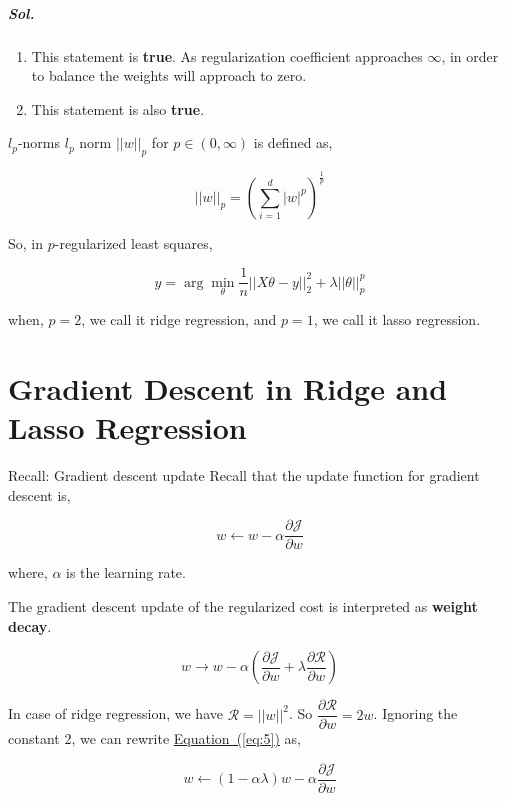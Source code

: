 \documentclass{scrartcl}
\renewcommand{\eqref}[1]{\hyperref[#1]{Equation~(\ref*{#1})}}
\begin{document}
	\subparagraph{Sol.}
	
	\begin{enumerate}[label*=\Roman*.]
		\item This statement is \textbf{true}. As regularization coefficient approaches \(\infty\), in order to balance the weights will approach to zero.
		
		\item This statement is also \textbf{true}.
	\end{enumerate}
	
	\begin{note}{\(l_p\)-norms}
		\(l_p\) norm \(||w||_p\) for \(p\in(0,\infty)\) is defined as,
		
		\[
			||w||_p=\left(\sum_{i=1}^{d}|w|^p\right)^\frac{1}{p}
		\]
		
		So, in \(p\)-regularized least squares,
		
		\[
			\hat{y}=\arg\min_\theta\frac1n||X\theta-y||_2^2+\lambda||\theta||_p^p
		\]
		
		when, \(p=2\), we call it ridge regression, and \(p=1\), we call it lasso regression.
	\end{note}
	
	\section{Gradient Descent in Ridge and Lasso Regression}
	
	\begin{recap}{Recall: Gradient descent update}
		Recall that the update function for gradient descent is,
		
		\[
			w\leftarrow w-\alpha \frac{\partial\mathcal{J}}{\partial w}
		\]
		
		where, \(\alpha\) is the learning rate.
	\end{recap}
	
	The gradient descent update of the regularized cost is interpreted as \textbf{weight decay}.
	
	\begin{equation}\label{eq:5}
		w\rightarrow w-\alpha\left(\frac{\partial \mathcal{J}}{\partial w}+\lambda\frac{\partial\mathcal{R}}{\partial w}\right)
	\end{equation}
	
	In case of ridge regression, we have \(\mathcal{R}=||w||^2\). So \(\dfrac{\partial \mathcal{R}}{\partial w}=2w\). Ignoring the constant 2, we can rewrite \eqref{eq:5} as,
	
	\begin{equation}\label{eq:6}
		w\leftarrow (1-\alpha\lambda)w-\alpha\frac{\partial\mathcal{J}}{\partial w}
	\end{equation}
	
\end{document}

